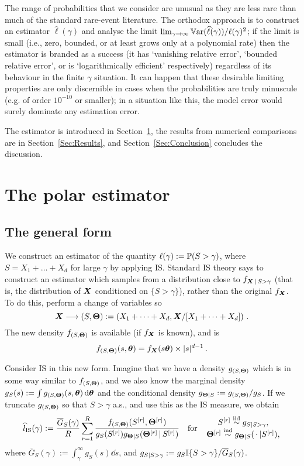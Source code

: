 The range of probabilities that we consider are unusual as they are less rare than much of the standard rare-event literature. The orthodox approach is to construct an estimator $\hat{\ell}(\gamma)$ and analyse the limit $\lim_{\gamma\to\infty} \operatorname{\mathbb{V}\mathrm{ar}}(\widehat{\ell}(\gamma))/\ell(\gamma)^2$; if the limit is small (i.e., zero, bounded, or at least grows only at a polynomial rate) then the estimator is branded as a success (it has `vanishing relative error', `bounded relative error', or is `logarithmically efficient' respectively) regardless of its behaviour in the finite $\gamma$ situation. It can happen that these desirable limiting properties are only discernible in cases when the probabilities are truly minuscule (e.g. of order $10^{-10}$ or smaller); in a situation like this, the model error would surely dominate any estimation error.

The estimator is introduced in Section~\ref{scn:Estimator}, the results from numerical comparisons are in Section~\ref{Sec:Results}, and Section~\ref{Sec:Conclusion} concludes the discussion.

\section{The polar estimator} \label{scn:Estimator}

\subsection{The general form}

We construct an estimator of the quantity $\ell(\gamma) := \operatorname{{\mathbb P}}(S > \gamma)$, where $S = X_1 + \dots + X_d$ for large $\gamma$ by applying IS.
Standard IS theory says to construct an estimator which samples from a distribution close to $f_{\bm{X} \,|\, S>\gamma}$ (that is, the distribution of $\bm{X}$ conditioned on $\{ S>\gamma \}$), rather than the original $f_{\bm{X}}$. To do this, perform a change of variables so
\[ \bm{X} \longrightarrow (S,\bm{\Theta}) := \left(X_1+\dots+X_d, \bm{X} / [X_1+\dots+X_d] \right) \,. \]
The new density $f_{(S,\bm{\Theta})}$ is available (if $f_{\bm{X}}$ is known), and is
\[
f_{(S,\bm{\Theta})}(s,\bm{\theta}) = f_{\bm{X}}(s\bm{\theta}) \times |s|^{d-1}\,.
\]

Consider IS in this new form. Imagine that we have a density $g_{(S,\bm{\Theta})}$ which is in some way similar to $f_{(S,\bm{\Theta})}$, and we also know the marginal density $g_S(s) := \int g_{(S,\bm{\Theta})}(s,\bm{\theta}) \mathop{}\!\mathrm{d} \bm{\theta}$ and the conditional density $g_{\bm{\Theta} \mid S}:=g_{(S,\bm{\Theta})}/g_S$. If we truncate $g_{(S,\bm{\Theta})}$ so that $S>\gamma$ a.s., and use this as the IS measure, we obtain
\begin{equation} \label{eq:general_form_estimator}
\hat{l}_{\mathrm{IS}}(\gamma) := \frac{\overline{G}_S(\gamma)}{R} \sum_{r=1}^R \frac{ f_{(S,\bfTheta)}(S^{[r]}, \bfTheta^{[r]}) }{ g_S( S^{[r]} ) g_{\bfTheta \mid S}(\bfTheta^{[r]}\,|\, S^{[r]})}
\quad \text{for} \quad
\genfrac{}{}{0pt}{}{ S^{[r]} \iidDist g_{S \mid S>\gamma}, }{ \bfTheta^{[r]} \indDist g_{\bfTheta \mid S}( \,\cdot\, | S^{[r]}), }
\end{equation}
where $\overline{G}_S(\gamma) :=  \int_{\gamma}^\infty g_S(s) \dd s$, and $g_{S \mid S>\gamma}:=g_S \mathbb{I}\{  S>\gamma  \} / \overline{G}_S(\gamma)$.

